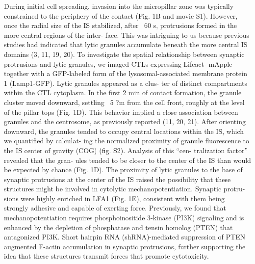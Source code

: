 During initial cell spreading, invasion into the micropillar zone was typically constrained to the periphery of the contact (Fig. 1B and movie S1). However, once the radial size of the IS stabilized, after ~60 s, protrusions formed in the more central regions of the inter- face. This was intriguing to us because previous studies had indicated that lytic granules accumulate beneath the more central IS domains (3, 11, 19, 20). To investigate the spatial relationship between synaptic protrusions and lytic granules, we imaged CTLs expressing Lifeact- mApple together with a GFP-labeled form of the lysosomal-associated membrane protein 1 (Lamp1-GFP). Lytic granules appeared as a clus- ter of distinct compartments within the CTL cytoplasm. In the first 2 min of contact formation, the granule cluster moved downward, settling ~5 ?m from the cell front, roughly at the level of the pillar tops (Fig. 1D). This behavior implied a close association between granules and the centrosome, as previously reported (11, 20, 21).
After orienting downward, the granules tended to occupy central locations within the IS, which we quantified by calculat- ing the normalized proximity of granule fluorescence to the IS center of gravity (COG) (fig. S2). Analysis of this “cen- tralization factor” revealed that the gran- ules tended to be closer to the center of the IS than would be expected by chance (Fig. 1D).
The proximity of lytic granules to the base of synaptic protrusions at the center of the IS raised the possibility that these structures might be involved in cytolytic mechanopotentiation. Synaptic protru- sions were highly enriched in LFA1 (Fig. 1E), consistent with them being strongly adhesive and capable of exerting force. Previously, we found that mechanopotentiation requires phosphoinositide 3-kinase (PI3K) signaling and is enhanced by the depletion of phosphatase and tensin homolog (PTEN) that antagonized PI3K. Short hairpin RNA (shRNA)-mediated suppression of PTEN augmented F-actin accumulation in synaptic protrusions, further supporting the idea that these structures transmit forces that promote cytotoxicity.

